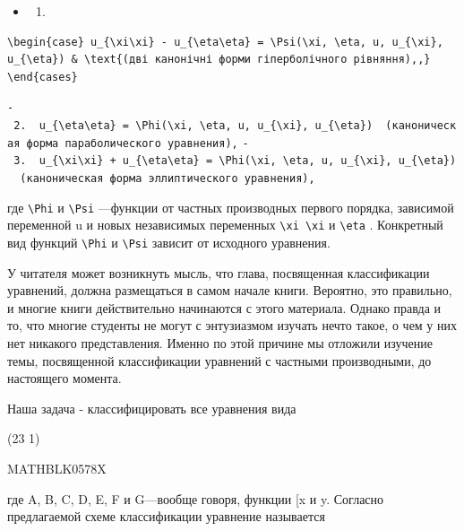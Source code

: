 \documentclass[
  ukrainian,
]{article}
\providecommand{\tightlist}{%
  \setlength{\itemsep}{0pt}\setlength{\parskip}{0pt}}
\begin{document}
\begin{itemize}
\tightlist
\item
  \begin{enumerate}
  \def\labelenumi{\arabic{enumi}.}
  \tightlist
  \item
  \end{enumerate}
\end{itemize}

\begin{verbatim}
\begin{case} u_{\xi\xi} - u_{\eta\eta} = \Psi(\xi, \eta, u, u_{\xi}, u_{\eta}) & \text{(дві канонічні форми гіперболічного рівняння),,} \end{cases}
\end{verbatim}

\texttt{-\ 2.\ \ \textquotesingle{}u\_\{\textbackslash{}eta\textbackslash{}eta\}\ =\ \textbackslash{}Phi(\textbackslash{}xi,\ \textbackslash{}eta,\ u,\ u\_\{\textbackslash{}xi\},\ u\_\{\textbackslash{}eta\})\textquotesingle{}\ \ (каноническая\ форма\ параболического\ уравнения),}
\texttt{-\ 3.\ \ \textquotesingle{}u\_\{\textbackslash{}xi\textbackslash{}xi\}\ +\ u\_\{\textbackslash{}eta\textbackslash{}eta\}\ =\ \textbackslash{}Phi(\textbackslash{}xi,\ \textbackslash{}eta,\ u,\ u\_\{\textbackslash{}xi\},\ u\_\{\textbackslash{}eta\})\textquotesingle{}\ \ (каноническая\ форма\ эллиптического\ уравнения),}

где \texttt{\textbackslash{}Phi} и \texttt{\textbackslash{}Psi}
---функции от частных производных первого порядка, зависимой переменной
u и новых независимых переменных
\texttt{\textbackslash{}xi\ \textbackslash{}xi} и
\texttt{\textbackslash{}eta} . Конкретный вид функций
\texttt{\textbackslash{}Phi} и \texttt{\textbackslash{}Psi} зависит от
исходного уравнения.

У читателя может возникнуть мысль, что глава, посвященная классификации
уравнений, должна размещаться в самом начале книги. Вероятно, это
правильно, и многие книги действительно начинаются с этого материала.
Однако правда и то, что многие студенты не могут с энтузиазмом изучать
нечто такое, о чем у них нет никакого представления. Именно по этой
причине мы отложили изучение темы, посвященной классификации уравнений с
частными производными, до настоящего момента.

Наша задача - классифицировать все уравнения вида

(23 1)

MATHBLK0578X

где A, B, C, D, E, F и G---вообще говоря, функции {[}x и y. Согласно
предлагаемой схеме классификации уравнение называется
\end{document}
